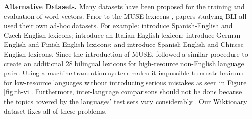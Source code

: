 \documentclass[11pt]{article}
\begin{document}
\noindent
\textbf{Alternative Datasets.}
Many datasets have been proposed for the training and evaluation of word vectors.
Prior to the MUSE lexicons \citep{conneau2017word},
papers studying BLI all used their own ad-hoc datasets.
For example:
\citet{mikolov2013exploiting} introduce Spanish-English and Czech-English lexicons;
\citet{dinu2014make} introduce an Italian-English lexicon;
\citet{artetxe2017learning} introduce German-English and Finish-English lexicons;
and \citet{zhang2017adversarial} introduce Spanish-English and Chinese-English lexicons.
Since the introduction of MUSE, \citet{glavas2019properly} followed a similar procedure to create an additional 28 bilingual lexicons for high-resource non-English language pairs.
Using a machine translation system makes it impossible to create lexicons for low-resource languages without introducing serious mistakes as seen in Figure \ref{fig:th-vi}.
Furthermore, inter-language comparisons should not be done because the topics covered by the languages' test sets vary considerably \citep{kementchedjhieva2019lost}.
Our Wiktionary dataset fixes all of these problems.



\label{sec:background}
\end{document}
